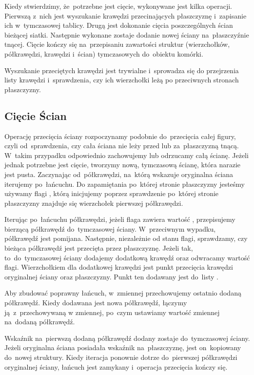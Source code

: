 \documentclass[skorowidz,autorrok,backref,xodstep,oswiadczenie]{wmimgr}
\begin{document}
Kiedy stwierdzimy, że~potrzebne jest cięcie, wykonywane jest kilka operacji. Pierwszą z~nich jest wyszukanie krawędzi przecinających płaszczyznę i~zapisanie ich w~tymczasowej tablicy. Drugą jest dokonanie cięcia poszczególnych ścian bieżącej siatki. Następnie wykonane zostaje dodanie nowej ściany na~płaszczyźnie tnącej. Cięcie kończy się na~przepisaniu zawartości struktur (wierzchołków, półkrawędzi, krawędzi i~ścian) tymczasowych do~obiektu komórki.

Wyszukanie przeciętych krawędzi jest trywialne i~sprowadza się do przejrzenia listy krawędzi i~sprawdzenia, czy ich wierzchołki leżą po przeciwnych stronach płaszczyzny.

\subsection{Cięcie Ścian}

Operację przecięcia ściany rozpoczynamy podobnie do~przecięcia całej figury, czyli od~sprawdzenia, czy cała ściana nie leży przed lub za~płaszczyzną tnącą. W~takim przypadku odpowiednio zachowujemy lub odrzucamy całą ścianę. Jeżeli jednak potrzebne jest cięcie, tworzymy nową, tymczasową ścianę, która narazie jest pusta. Zaczynając od~półkrawędzi, na~którą wskazuje oryginalna ściana iterujemy po~łańcuchu. Do zapamiętania po~której stronie płaszczyzny jesteśmy używamy flagi , którą inicjujemy poprzez sprawdzenie po~której stronie płaszczyzny znajduje się wierzchołek pierwszej półkrawędzi.

Iterując po~łańcuchu półkrawędzi, jeżeli flaga  zawiera wartość , przepisujemy bierzącą półkrawędź do~tymczasowej ściany. W~przeciwnym wypadku, półkrawędź jest pomijana. Następnie, niezależnie od stanu flagi, sprawdzamy, czy bieżąca półkrawędź jest przecięta przez płaszczyznę. Jeżeli tak, to~do~tymczasowej ściany dodajemy dodatkową krawędź oraz odwracamy wartość flagi. Wierzchołkiem dla dodatkowej krawędzi jest punkt przecięcia krawędzi oryginalnej ściany oraz płaszczyzny. Punkt ten dodawany jest do~listy .

Aby zbudować poprawny łańcuch, w~zmiennej  przechowujemy ostatnio dodaną półkrawędź. Kiedy dodawana jest nowa półkrawędź, łączymy ją~z~przechowywaną w zmiennej, po~czym ustawiamy wartość zmiennej na~dodaną półkrawędź.

Wskaźnik na~pierwszą dodaną półkrawędź dodany zostaje do~tymczasowej ściany. Jeżeli oryginalna ściana posiadała wskaźnik na~płaszczyznę, jest on~kopiowany do~nowej struktury. Kiedy iteracja ponownie dotrze do~pierwszej półkrawędzi oryginalnej ściany, łańcuch jest zamykany i~operacja przecięcia kończy się.
\end{document}
